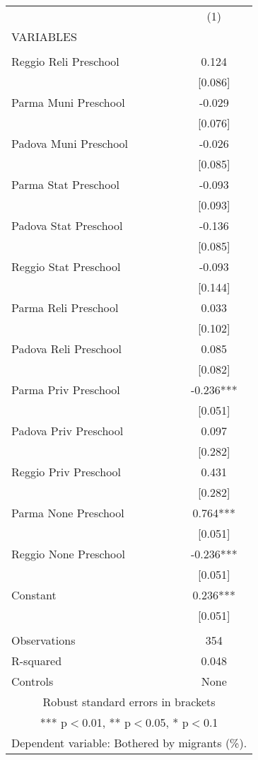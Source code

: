 \begin{tabular}{lc} \hline
 & (1) \\
VARIABLES &  \\ \hline
 &  \\
Reggio Reli Preschool & 0.124 \\
 & [0.086] \\
Parma Muni Preschool & -0.029 \\
 & [0.076] \\
Padova Muni Preschool & -0.026 \\
 & [0.085] \\
Parma Stat Preschool & -0.093 \\
 & [0.093] \\
Padova Stat Preschool & -0.136 \\
 & [0.085] \\
Reggio Stat Preschool & -0.093 \\
 & [0.144] \\
Parma Reli Preschool & 0.033 \\
 & [0.102] \\
Padova Reli Preschool & 0.085 \\
 & [0.082] \\
Parma Priv Preschool & -0.236*** \\
 & [0.051] \\
Padova Priv Preschool & 0.097 \\
 & [0.282] \\
Reggio Priv Preschool & 0.431 \\
 & [0.282] \\
Parma None Preschool & 0.764*** \\
 & [0.051] \\
Reggio None Preschool & -0.236*** \\
 & [0.051] \\
Constant & 0.236*** \\
 & [0.051] \\
 &  \\
Observations & 354 \\
R-squared & 0.048 \\
 Controls & None \\ \hline
\multicolumn{2}{c}{ Robust standard errors in brackets} \\
\multicolumn{2}{c}{ *** p$<$0.01, ** p$<$0.05, * p$<$0.1} \\
\multicolumn{2}{c}{ Dependent variable: Bothered by migrants (\%).} \\
\end{tabular}
